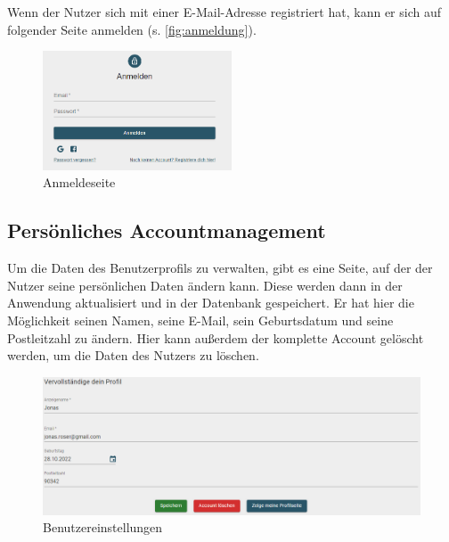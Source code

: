 Wenn der Nutzer sich mit einer E-Mail-Adresse registriert hat, kann er sich auf folgender Seite anmelden (s. \autoref{fig:anmeldung}).

\begin{figure}[htb]
    \centering
    \includegraphics[width=0.5\textwidth]{figures/boas/21_anmelden.png}
    \caption[]{Anmeldeseite}
    \label{fig:anmeldung}
\end{figure}

\clearpage

\subsection{Persönliches Accountmanagement}
\label{sec:accountmanagement}

Um die Daten des Benutzerprofils zu verwalten, gibt es eine Seite, auf der der Nutzer seine persönlichen Daten ändern kann.
Diese werden dann in der Anwendung aktualisiert und in der Datenbank gespeichert. Er hat hier die Möglichkeit seinen Namen, seine E-Mail, sein Geburtsdatum und seine Postleitzahl zu ändern.
Hier kann außerdem der komplette Account gelöscht werden, um die Daten des Nutzers zu löschen.

\begin{figure}[ht!]
    \begin{centering}
        \includegraphics[width=1\textwidth]{figures/implementation/userSettings.png}
        \caption{Benutzereinstellungen}
        \label{fig:userSettings}
    \end{centering}
\end{figure}

